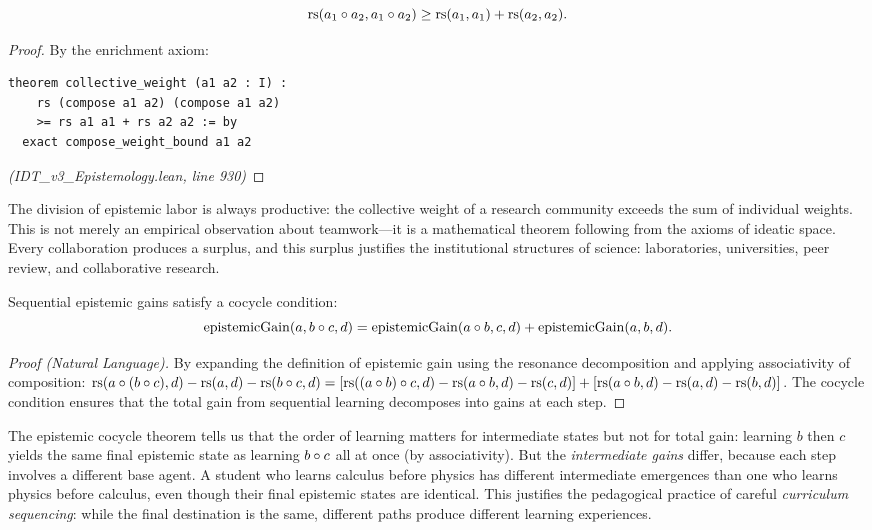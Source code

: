 \begin{theorem}
\label{thm:collective-weight}
\[
  \mathrm{rs}(a_1 \circ a_2, a_1 \circ a_2) \geq \mathrm{rs}(a_1, a_1) + \mathrm{rs}(a_2, a_2).
\]
\end{theorem}

\begin{proof}
By the enrichment axiom:
\begin{lstlisting}
theorem collective_weight (a1 a2 : I) :
    rs (compose a1 a2) (compose a1 a2)
    >= rs a1 a1 + rs a2 a2 := by
  exact compose_weight_bound a1 a2
\end{lstlisting}
\textit{(IDT\_v3\_Epistemology.lean, line 930)}
\end{proof}

\begin{interpretation}
The division of epistemic labor is always productive: the collective weight of
a research community exceeds the sum of individual weights. This is not merely
an empirical observation about teamwork---it is a mathematical theorem following
from the axioms of ideatic space. Every collaboration produces a surplus, and
this surplus justifies the institutional structures of science: laboratories,
universities, peer review, and collaborative research.
\end{interpretation}

\begin{theorem}
\label{thm:epistemic-cocycle}
Sequential epistemic gains satisfy a cocycle condition:
\[
  \mathrm{epistemicGain}(a, b \circ c, d) = \mathrm{epistemicGain}(a \circ b, c, d) + \mathrm{epistemicGain}(a, b, d).
\]
\end{theorem}

\begin{proof}[Proof (Natural Language)]
By expanding the definition of epistemic gain using the resonance decomposition
and applying associativity of composition: $\mathrm{rs}(a \circ (b \circ c), d) -
\mathrm{rs}(a, d) - \mathrm{rs}(b \circ c, d) = [\mathrm{rs}((a \circ b) \circ c, d) - \mathrm{rs}(a
\circ b, d) - \mathrm{rs}(c, d)] + [\mathrm{rs}(a \circ b, d) - \mathrm{rs}(a, d) - \mathrm{rs}(b, d)]$.
The cocycle condition ensures that the total gain from sequential learning
decomposes into gains at each step.
\end{proof}

\begin{interpretation}
The epistemic cocycle theorem tells us that the order of learning matters for
intermediate states but not for total gain: learning $b$ then $c$ yields the
same final epistemic state as learning $b \circ c$ all at once (by
associativity). But the \emph{intermediate gains} differ, because each step
involves a different base agent. A student who learns calculus before physics
has different intermediate emergences than one who learns physics before
calculus, even though their final epistemic states are identical. This justifies
the pedagogical practice of careful \emph{curriculum sequencing}: while the
final destination is the same, different paths produce different learning
experiences.
\end{interpretation}

